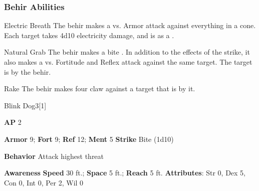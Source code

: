 \subsubsection{Behir Abilities}

\begin{freeability}{Electric Breath}
The behir makes a  vs. Armor attack against everything in a \areamed cone.
\hit Each target takes 4d10 electricity damage, and is  as a .
\end{freeability}

\vspace{0.5em}
\begin{freeability}{Natural Grab}
The behir makes a bite .
In addition to the effects of the strike, it also makes a  vs. Fortitude and Reflex attack against the same target.
\hit The target is  by the behir.
\end{freeability}

\vspace{0.5em}
\begin{apability}{Rake}
The behir makes four claw  against a target that is  by it.
\end{apability}

\begin{monsection}{Blink Dog}{3}[1]
\vspace{-1em}\vspace{-1em}
\begin{spellcontent}
\begin{spelltargetinginfo}
{\textbf{AP} 2}

\pari \textbf{Armor} 9;
\textbf{Fort} 9;
\textbf{Ref} 12;
\textbf{Ment} 5
\pari \textbf{Strike} Bite  (1d10)



\pari \textbf{Behavior} Attack highest threat
\end{spelltargetinginfo}
\end{spellcontent}

\begin{monsterfooter}
\pari \textbf{Awareness} 
\pari \textbf{Speed} 30 ft.;
\textbf{Space} 5 ft.;
\textbf{Reach} 5 ft.
\pari \textbf{Attributes}:
Str 0,
Dex 5,
Con 0,
Int 0,
Per 2,
Wil 0
\end{monsterfooter}
\end{monsection}


